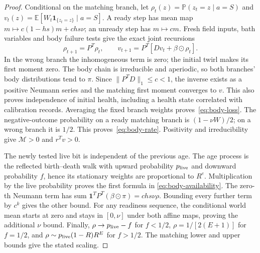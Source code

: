 \documentclass[11pt,a4paper]{article}
\newcommand{\E}{\mathbb E}
\newcommand{\Prb}{\mathbb P}
\begin{document}
\begin{proof}
Conditional on the matching branch, let
$\rho_t(z)=\Prb(z_t=z\mid a=S)$ and
$v_t(z)=\E[W_t\mathbf1_{\{z_t=z\}}\mid a=S]$.
A ready step has mean map $m\mapsto c(1-hs)m+chs\nu$;
an unready step has $m\mapsto cm$.
Fresh field inputs, bath variables and body failure tests give
the exact joint recursions
\[
 \rho_{t+1}=P^T\rho_t,\qquad
 v_{t+1}=P^T[Dv_t+\beta\odot\rho_t].
\]
In the wrong branch the inhomogeneous term is zero; the initial
twirl makes its first moment zero. The body chain is irreducible
and aperiodic, so both branches' body distributions tend to $\pi$.
Since $\|P^TD\|_1\le c<1$, the inverse exists as a positive Neumann
series and the matching first moment converges to $v$. This also
proves independence of initial health, including a health state
correlated with calibration records. Averaging the fixed branch
weights proves~\eqref{eq:body-loss}. The negative-outcome probability
on a ready matching branch is $(1-\nu W)/2$; on a wrong branch it
is $1/2$. This proves~\eqref{eq:body-rate}.
Positivity and irreducibility give $\mathcal M>0$ and $r^Tv>0$.

The newly tested live bit is independent of the previous age.
The age process is the reflected birth--death walk with upward
probability $p_{\rm live}$ and downward probability $f$, hence
its stationary weights are proportional to $R^e$. Multiplication
by the live probability proves the first formula in
\eqref{eq:body-availability}. The zero-th Neumann term has sum
$\mathbf1^TP^T(\beta\odot\pi)=chs\nu\rho$.
Bounding every further term by $c^k$ gives the other bound.
For any readiness sequence, the conditional world mean starts at
zero and stays in $[0,\nu]$ under both affine maps, proving the
additional $\nu$ bound. Finally,
$\rho\to p_{\rm live}-f$ for $f<1/2$,
$\rho=1/[2(E+1)]$ for $f=1/2$, and
$\rho\sim p_{\rm live}(1-R)R^E$ for $f>1/2$.
The matching lower and upper bounds give the stated scaling.
\end{proof}
\end{document}
